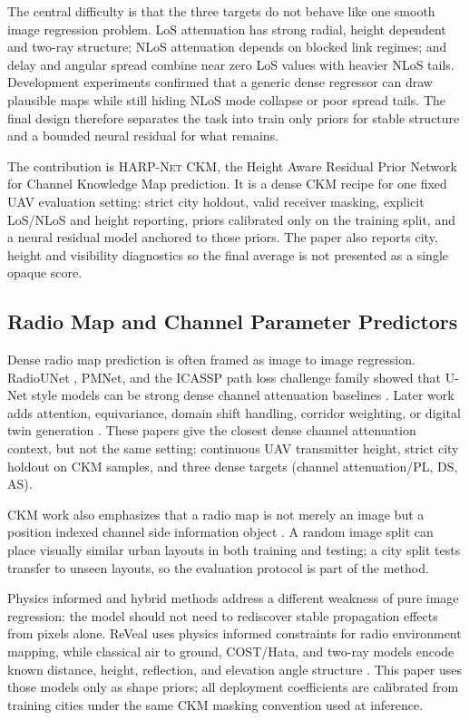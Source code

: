 \documentclass[journal]{IEEEtran}
\begin{document}
The central difficulty is that the three targets do not behave like one smooth
image regression problem. LoS attenuation has strong radial, height dependent
and two-ray structure; NLoS attenuation depends on blocked link regimes; and
delay and angular spread combine near zero LoS values with heavier NLoS tails.
Development experiments confirmed that a generic dense regressor can draw
plausible maps while still hiding NLoS mode collapse or poor spread tails.
The final design therefore separates the task into train only priors for stable
structure and a bounded neural residual for what remains.

The contribution is \textsc{HARP-Net CKM}, the Height Aware Residual Prior
Network for Channel Knowledge Map prediction. It is a dense CKM recipe for one
fixed UAV evaluation setting: strict city holdout, valid receiver masking,
explicit LoS/NLoS and height reporting, priors calibrated only on the training
split, and a neural residual model anchored to those priors. The paper also reports
city, height and visibility diagnostics so the final average is not presented
as a single opaque score.

\subsection{Radio Map and Channel Parameter Predictors}

Dense radio map prediction is often framed as image to image regression.
RadioUNet \cite{radiounet2020}, PMNet, and the ICASSP path loss challenge
family showed that U-Net style models can be strong dense channel attenuation baselines
\cite{pmnet2023,pmnet_icassp2023,icassp2023challenge}. Later work adds
attention, equivariance, domain shift handling, corridor weighting, or digital
twin generation \cite{rmtransformer2025,radiogunet2025,pathfinder2025,
gao2026,airmap2025}. These papers give the closest dense channel attenuation context, but not
the same setting: continuous UAV transmitter height, strict city holdout on CKM samples,
and three dense targets (channel attenuation/PL, DS, AS).

CKM work also emphasizes that a radio map is not merely an image but a
position indexed channel side information object \cite{zengx2021ckm,
ckmtutorial2024,ckmdata2024}. A random image split can place visually similar
urban layouts in both training and testing; a city split tests transfer to
unseen layouts, so the evaluation protocol is part of the method.

Physics informed and hybrid methods address a different weakness of pure image
regression: the model should not need to rediscover stable propagation effects
from pixels alone. ReVeal \cite{reveal2025} uses physics informed constraints
for radio environment mapping, while classical air to ground, COST/Hata, and
two-ray models encode known distance, height, reflection, and elevation angle
structure \cite{rappaport,goldsmith,cost231,alhourani2014,khawaja_survey,
tr38901,wocc2021}. This paper uses those models only as shape priors; all
deployment coefficients are calibrated from training cities under the same CKM
masking convention used at inference.
\end{document}
